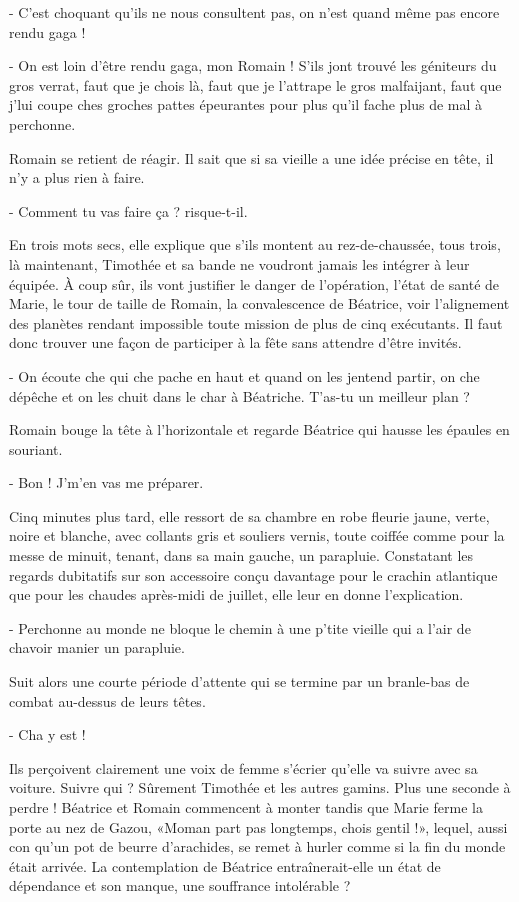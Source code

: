 - C’est choquant qu’ils ne nous consultent pas, on n’est quand même pas encore rendu gaga !

- On est loin d’être rendu gaga, mon Romain ! S’ils jont trouvé les géniteurs du gros verrat, faut que je chois là, faut que je l’attrape le gros malfaijant, faut que j’lui coupe ches groches pattes épeurantes pour plus qu’il fache plus de mal à perchonne.

Romain se retient de réagir. Il sait que si sa vieille a une idée précise en tête, il n’y a plus rien à faire.

- Comment tu vas faire ça ? risque-t-il.

En trois mots secs, elle explique que s’ils montent au rez-de-chaussée, tous trois, là maintenant, Timothée et sa bande ne voudront jamais les intégrer à leur équipée. À coup sûr, ils vont justifier le danger de l’opération, l’état de santé de Marie, le tour de taille de Romain, la convalescence de Béatrice, voir l’alignement des planètes rendant impossible toute mission de plus de cinq exécutants. Il faut donc trouver une façon de participer à la fête sans attendre d’être invités.

- On écoute che qui che pache en haut et quand on les jentend partir, on che dépêche et on les chuit dans le char à Béatriche. T’as-tu un meilleur plan ?

Romain bouge la tête à l’horizontale et regarde Béatrice qui hausse les épaules en souriant.

- Bon ! J’m’en vas me préparer.

Cinq minutes plus tard, elle ressort de sa chambre en robe fleurie jaune, verte, noire et blanche, avec collants gris et souliers vernis, toute coiffée comme pour la messe de minuit, tenant, dans sa main gauche, un parapluie. Constatant les regards dubitatifs sur son accessoire conçu davantage pour le crachin atlantique que pour les chaudes après-midi de juillet, elle leur en donne l’explication.

- Perchonne au monde ne bloque le chemin à une p’tite vieille qui a l’air de chavoir manier un parapluie.

Suit alors une courte période d’attente qui se termine par un branle-bas de combat au-dessus de leurs têtes.

- Cha y est !

Ils perçoivent clairement une voix de femme s’écrier qu’elle va suivre avec sa voiture. Suivre qui ? Sûrement Timothée et les autres gamins. Plus une seconde à perdre ! Béatrice et Romain commencent à monter tandis que Marie ferme la porte au nez de Gazou, «Moman part pas longtemps, chois gentil !», lequel, aussi con qu’un pot de beurre d’arachides, se remet à hurler comme si la fin du monde était arrivée. La contemplation de Béatrice entraînerait-elle un état de dépendance et son manque, une souffrance intolérable ?

